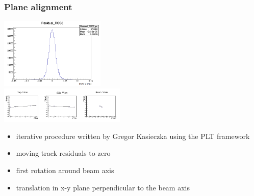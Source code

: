 \documentclass[9pt]{beamer}
\begin{document}
\begin{frame}
	\frametitle{Plane alignment}
	\begin{center}
		\begin{minipage}{6cm}
			\centering
			\includegraphics[width=5cm]{Residual}\\
			\includegraphics[width=6cm]{Track}
		\end{minipage}
		\begin{minipage}[c][.5\textheight]{5cm}
			\begin{itemize}
				\setlength{\itemsep}{\fill}
				\item iterative procedure written by Gregor Kasieczka using the PLT framework
				\item moving track residuals to zero
				\item first rotation around beam axis
				\item translation in x-y plane perpendicular to the beam axis
			\end{itemize}
		\end{minipage}
	\end{center}
\end{frame}
\end{document}
